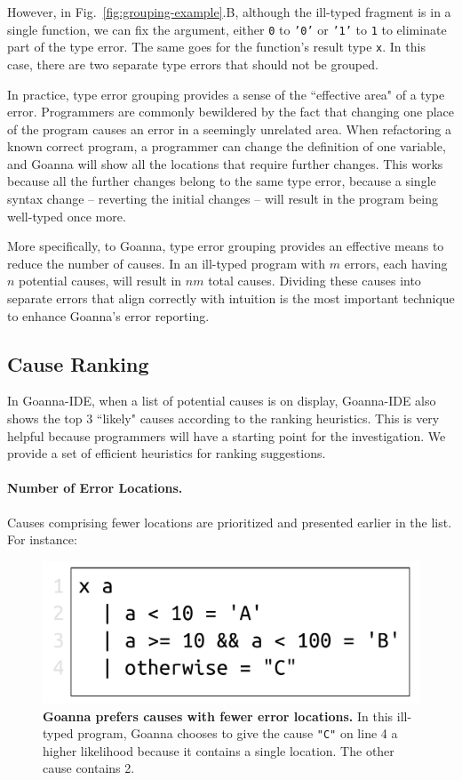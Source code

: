 \documentclass[pdflatex,sn-mathphys-num]{sn-jnl}%
\begin{document}
    However, in Fig.~\ref{fig:grouping-example}.B, although the ill-typed fragment is in a single function, we can fix the argument, either \texttt{0} to \texttt{'0'} or \texttt{'1'} to \texttt{1} to eliminate part of the type error. The same goes for the function's result type \texttt{x}. In this case, there are two separate type errors that should not be grouped.

	In practice, type error grouping provides a sense of the ``effective area" of a type error. Programmers are commonly bewildered by the fact that changing one place of the program causes an error in a seemingly unrelated area. When refactoring a known correct program, a programmer can change the definition of one variable, and Goanna will show all the locations that require further changes. This works because all the further changes belong to the same type error, because a single syntax change -- reverting the initial changes -- will result in the program being well-typed once more.
	
	More specifically, to Goanna, type error grouping provides an effective means to reduce the number of causes. In an ill-typed program with $m$ errors, each having $n$ potential causes, will result in $nm$ total causes. Dividing these causes into separate errors that align correctly with intuition is the most important technique to enhance Goanna's error reporting.

    \subsection{Cause Ranking} \label{sub:ranking}
     In Goanna-IDE, when a list of potential causes is on display, Goanna-IDE also shows the top 3 ``likely" causes according to the ranking heuristics. This is very helpful because programmers will have a starting point for the investigation. We provide a set of efficient heuristics for ranking suggestions. 

    \paragraph{Number of Error Locations.}
    Causes comprising fewer locations are prioritized and presented earlier in the list. For instance:
   \begin{figure}[ht!]
        \centering
        \includegraphics[width=0.5\linewidth]{images/Loc-Count}
        \caption[Goanna prefers causes with fewer error locations]{\textbf{Goanna prefers causes with fewer error locations.} In this ill-typed program, Goanna chooses to give the cause \texttt{"C"} on line 4 a higher likelihood because it contains a single location. The other cause contains 2. }
        \label{fig:loc-count}
    \end{figure}
\end{document}
